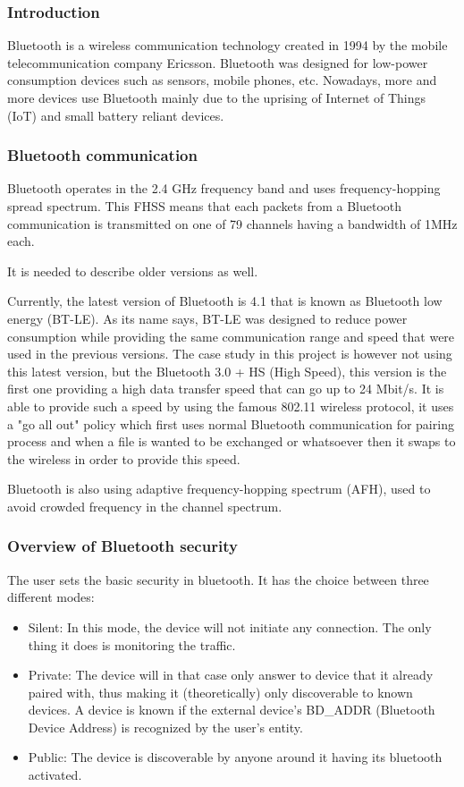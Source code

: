 \subsubsection{Introduction}
Bluetooth is a wireless communication technology created in 1994 by the mobile telecommunication company Ericsson. Bluetooth was designed for low-power consumption devices such as sensors, mobile phones, etc. Nowadays, more and more devices use Bluetooth mainly due to the uprising of Internet of Things (IoT) and small battery reliant devices.

\subsubsection{Bluetooth communication}
Bluetooth operates in the 2.4 GHz frequency band and uses frequency-hopping spread spectrum. This FHSS means that each packets from a Bluetooth communication is transmitted on one of 79 channels having a bandwidth of 1MHz each. 

\Large It is needed to describe older versions as well.

Currently, the latest version of Bluetooth is 4.1 that is known as Bluetooth low energy (BT-LE). As its name says, BT-LE was designed to reduce power consumption while providing the same communication range and speed that were used in the previous versions. 
The case study in this project is however not using this latest version, but the Bluetooth 3.0 + HS (High Speed), this version is  the first one providing a high data transfer speed that can go up to 24 Mbit/s. It is able to provide such a speed by using the famous 802.11 wireless protocol, it uses a "go all out" policy which first uses normal Bluetooth communication for pairing process and when a file is wanted to be exchanged or whatsoever then it swaps to the wireless in order to provide this speed.

Bluetooth is also using adaptive frequency-hopping spectrum (AFH), used to avoid crowded frequency in the channel spectrum.

\subsubsection{Overview of Bluetooth security}
The user sets the basic security in bluetooth. It has the choice between three different modes:
 \begin{itemize}
 	\item Silent: In this mode, the device will not initiate any connection. The only thing it does is monitoring the traffic.
 	\item Private: The device will in that case only answer to device that it already paired with, thus making it (theoretically) only discoverable to known devices. A device is known if the external device's BD_ADDR (Bluetooth Device Address) is recognized by the user's entity.
 	\item Public: The device is discoverable by anyone around it having its bluetooth activated.
 \end{itemize}
 
